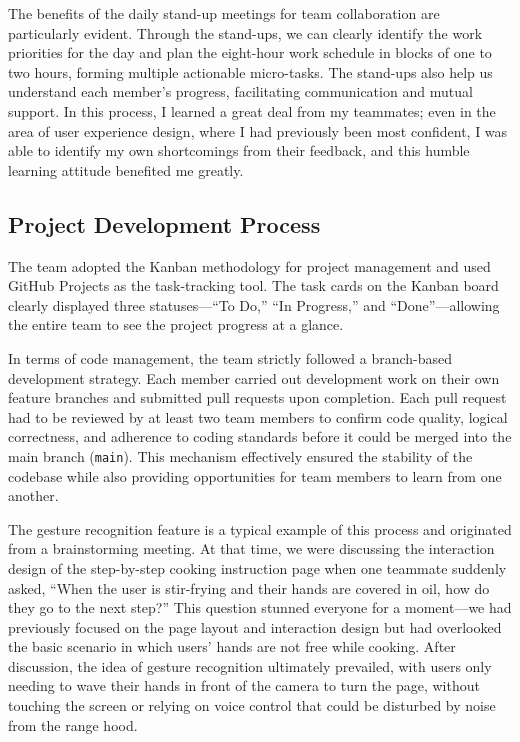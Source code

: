 \documentclass[sigconf]{acmart}
\begin{document}
The benefits of the daily stand-up meetings for team collaboration are particularly evident. Through the stand-ups, we can clearly identify the work priorities for the day and plan the eight-hour work schedule in blocks of one to two hours, forming multiple actionable micro-tasks. The stand-ups also help us understand each member's progress, facilitating communication and mutual support. In this process, I learned a great deal from my teammates; even in the area of user experience design, where I had previously been most confident, I was able to identify my own shortcomings from their feedback, and this humble learning attitude benefited me greatly.

\subsection{Project Development Process}

The team adopted the Kanban methodology for project management and used GitHub Projects as the task-tracking tool. The task cards on the Kanban board clearly displayed three statuses---``To Do,'' ``In Progress,'' and ``Done''---allowing the entire team to see the project progress at a glance.

In terms of code management, the team strictly followed a branch-based development strategy. Each member carried out development work on their own feature branches and submitted pull requests upon completion. Each pull request had to be reviewed by at least two team members to confirm code quality, logical correctness, and adherence to coding standards before it could be merged into the main branch (\texttt{main}). This mechanism effectively ensured the stability of the codebase while also providing opportunities for team members to learn from one another.

The gesture recognition feature is a typical example of this process and originated from a brainstorming meeting. At that time, we were discussing the interaction design of the step-by-step cooking instruction page when one teammate suddenly asked, ``When the user is stir-frying and their hands are covered in oil, how do they go to the next step?'' This question stunned everyone for a moment---we had previously focused on the page layout and interaction design but had overlooked the basic scenario in which users' hands are not free while cooking. After discussion, the idea of gesture recognition ultimately prevailed, with users only needing to wave their hands in front of the camera to turn the page, without touching the screen or relying on voice control that could be disturbed by noise from the range hood.
\end{document}
